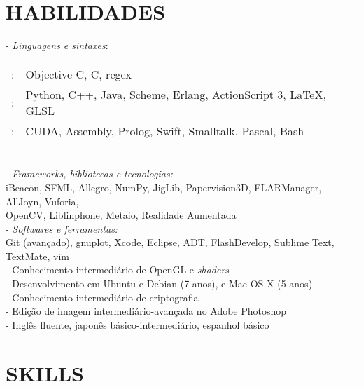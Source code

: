\documentclass[]{res} %
\def \divspace{6pt}
\begin{document}
\begin{resume}
    \section{HABILIDADES \hspace{\divspace} }

    - {\sl Linguagens e sintaxes}: \\
    \setlength\tabcolsep{2pt}
    \begin{tabular}{r l}
    \hspace*{1.5em}{\sl Fluente}:& Objective-C, C, regex \\
    \hspace*{1.5em}{\sl Muito Familiar}:& Python, C++, Java, Scheme, Erlang, ActionScript 3, \LaTeX, GLSL \\
    \hspace*{1.5em}{\sl Pouco Familiar}:& CUDA, Assembly, Prolog, Swift, Smalltalk, Pascal, Bash \\
    \end{tabular}
    \\
    - {\sl Frameworks, bibliotecas e tecnologias:} \\
    \hspace*{1.5em}iBeacon, SFML, Allegro, NumPy, JigLib, Papervision3D, FLARManager, AllJoyn, Vuforia, \\
    \hspace*{1.5em}OpenCV, Liblinphone, Metaio, Realidade Aumentada
    \\
    - {\sl Softwares e ferramentas:} \\
    \hspace*{1.5em}Git (avançado), gnuplot, Xcode, Eclipse, ADT, FlashDevelop, Sublime Text, TextMate, vim
    \\
    - Conhecimento intermediário de OpenGL e {\it shaders} \\
    - Desenvolvimento em Ubuntu e Debian (7 anos), e Mac OS X (5 anos) \\
    - Conhecimento intermediário de criptografia \\
    - Edição de imagem intermediário-avançada no Adobe Photoshop \\
    - Inglês fluente, japonês básico-intermediário, espanhol básico
\else
    \section{SKILLS \hspace{\divspace} }


\end{resume}
\end{document}
